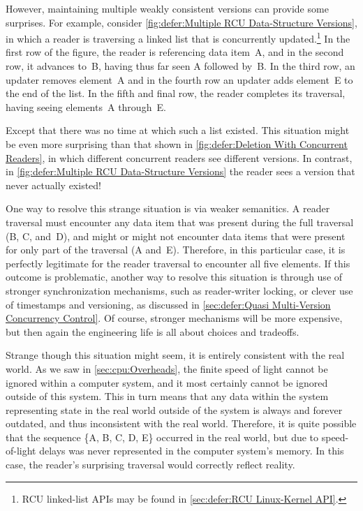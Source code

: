 However, maintaining multiple weakly consistent versions can provide
some surprises.
For example, consider
\cref{fig:defer:Multiple RCU Data-Structure Versions},
in which a reader is traversing a linked list that is concurrently
updated.\footnote{
	RCU linked-list APIs may be found in
	\cref{sec:defer:RCU Linux-Kernel API}.}
In the first row of the figure, the reader is referencing data item~A,
and in the second row, it advances to~B, having thus far seen A followed by~B\@.
In the third row, an updater removes element~A and in the fourth row
an updater adds element~E to the end of the list.
In the fifth and final row, the reader completes its traversal, having
seeing elements~A through~E\@.

Except that there was no time at which such a list existed.
This situation might be even more surprising than that shown in
\cref{fig:defer:Deletion With Concurrent Readers},
in which different concurrent readers see different versions.
In contrast, in
\cref{fig:defer:Multiple RCU Data-Structure Versions}
the reader sees a version that never actually existed!

One way to resolve this strange situation is via weaker semanitics.
A reader traversal must encounter any data item that was present
during the full traversal (B, C, and~D), and might or might not
encounter data items that were present for only part of the
traversal (A and~E)\@.
Therefore, in this particular case, it is perfectly legitimate for
the reader traversal to encounter all five elements.
If this outcome is problematic, another way to resolve this situation is
through use of stronger synchronization mechanisms, such as reader-writer
locking, or clever use of timestamps and versioning,
as discussed in \cref{sec:defer:Quasi Multi-Version Concurrency Control}.
Of course, stronger mechanisms will be more expensive, but then again
the engineering life is all about choices and tradeoffs.

Strange though this situation might seem, it is entirely consistent with
the real world.
As we saw in
\cref{sec:cpu:Overheads},
the finite speed of light cannot be ignored within a computer system,
and it most certainly cannot be ignored outside of this system.
This in turn means that any data within the system representing state
in the real world outside of the system is always and forever outdated,
and thus inconsistent with the real world.
Therefore, it is quite possible that the sequence \{A, B, C, D, E\}
occurred in the real world, but due to speed-of-light delays was
never represented in the computer system's memory.
In this case, the reader's surprising traversal would correctly reflect
reality.

